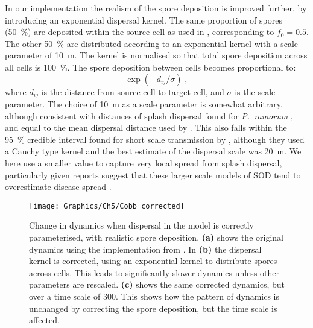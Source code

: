 In our implementation the realism of the spore deposition is improved further, by introducing an exponential dispersal kernel. The same proportion of spores (\SI{50}{\percent}) are deposited within the source cell as used in \citet{cobb_ecosystem_2012}, corresponding to $f_0=\num{0.5}$. The other \SI{50}{\percent} are distributed according to an exponential kernel with a scale parameter of \SI{10}{\meter}. The kernel is normalised so that total spore deposition across all cells is \SI{100}{\percent}. The spore deposition between cells becomes proportional to:
\begin{equation}\label{eqn:ch5:spore_kernel}
    \exp{\left(-d_{ij}/\sigma\right)}\;,
\end{equation}
where $d_{ij}$ is the distance from source cell to target cell, and $\sigma$ is the scale parameter. The choice of \SI{10}{\meter} as a scale parameter is somewhat arbitrary, although consistent with distances of splash dispersal found for \emph{P.~ramorum} \citep{davidson_transmission_2005}, and equal to the mean dispersal distance used by \citet{cobb_ecosystem_2012}. This also falls within the \SI{95}{\percent} credible interval found for short scale transmission by \citet{meentemeyer_epidemiological_2011}, although they used a Cauchy type kernel and the best estimate of the dispersal scale was \SI{20}{\meter}. We here use a smaller value to capture very local spread from splash dispersal, particularly given reports suggest that these larger scale models of SOD tend to overestimate disease spread \citep{valachovic_well_2017}.

\begin{figure}[t]
    \begin{center}
        \texttt{[image: Graphics/Ch5/Cobb\_corrected]}
        \caption[Change in model dynamics under corrected parameters]{Change in dynamics when dispersal in the model is correctly parameterised, with realistic spore deposition. \textbf{(a)} shows the original dynamics using the implementation from \citet{cobb_ecosystem_2012}. In \textbf{(b)} the dispersal kernel is corrected, using an exponential kernel to distribute spores across cells. This leads to significantly slower dynamics unless other parameters are rescaled. \textbf{(c)} shows the same corrected dynamics, but over a time scale of \SI{300}{\years}. This shows how the pattern of dynamics is unchanged by correcting the spore deposition, but the time scale is affected.\label{fig:ch5:cobb_spatial_rate}}
    \end{center}
\end{figure}

